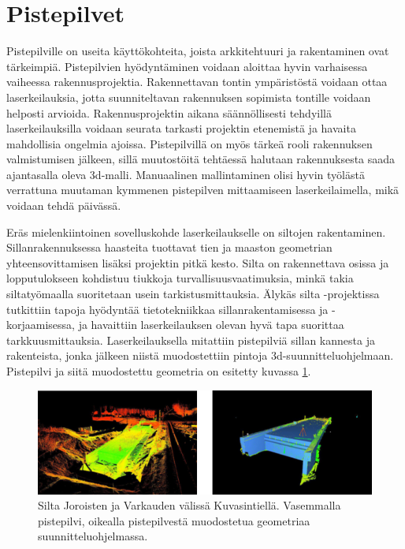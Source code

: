\section{Pistepilvet}\label{pistepilvet}

Pistepilville on useita käyttökohteita, joista arkkitehtuuri ja rakentaminen ovat tärkeimpiä. Pistepilvien hyödyntäminen voidaan aloittaa hyvin varhaisessa vaiheessa rakennusprojektia. Rakennettavan tontin ympäristöstä voidaan ottaa laserkeilauksia, jotta suunniteltavan rakennuksen sopimista tontille voidaan helposti arvioida. Rakennusprojektin aikana säännöllisesti tehdyillä laserkeilauksilla voidaan seurata tarkasti projektin etenemistä ja havaita mahdollisia ongelmia ajoissa. Pistepilvillä on myös tärkeä rooli rakennuksen valmistumisen jälkeen, sillä muutostöitä tehtäessä halutaan rakennuksesta saada ajantasalla oleva 3d-malli. Manuaalinen mallintaminen olisi hyvin työlästä verrattuna muutaman kymmenen pistepilven mittaamiseen laserkeilaimella, mikä voidaan tehdä päivässä. \cite{bim} 

Eräs mielenkiintoinen sovelluskohde laserkeilaukselle on siltojen rakentaminen. Sillanrakennuksessa haasteita tuottavat tien ja maaston geometrian yhteensovittamisen lisäksi projektin pitkä kesto. Silta on rakennettava osissa ja lopputulokseen kohdistuu tiukkoja turvallisuusvaatimuksia, minkä takia siltatyömaalla suoritetaan usein tarkistusmittauksia. Älykäs silta -projektissa tutkittiin tapoja hyödyntää tietotekniikkaa sillanrakentamisessa ja -korjaamisessa, ja havaittiin laserkeilauksen olevan hyvä tapa suorittaa tarkkuusmittauksia. Laserkeilauksella mitattiin pistepilviä sillan kannesta ja rakenteista, jonka jälkeen niistä muodostettiin pintoja 3d-suunnitteluohjelmaan. Pistepilvi ja siitä muodostettu geometria on esitetty kuvassa \ref{silt}. \cite{silta}   

\begin{figure}
    \centering
    \includegraphics[width=\textwidth]{img/silta.png}
    \caption{Silta Joroisten ja Varkauden välissä Kuvasintiellä. Vasemmalla pistepilvi, oikealla pistepilvestä muodostetua geometriaa suunnitteluohjelmassa. \cite{silta}}
    \label{silt}
\end{figure}

